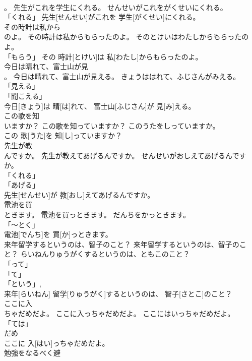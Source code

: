 \documentclass[8pt]{extreport}
\begin{document}
\begin{CJK}{UTF8}{min}
\\	。	先生がこれを学生にくれる。	せんせいがこれをがくせいにくれる。	
\\	「くれる」	先生[せんせい]がこれを 学生[がくせい]にくれる。		
\\	その時計は私から
\\	のよ。	その時計は私からもらったのよ。	そのとけいはわたしからもらったのよ。	
\\	「もらう」	その 時計[とけい]は 私[わたし]からもらったのよ。		
\\	今日は晴れて、富士山が見
\\	。	今日は晴れて、富士山が見える。	きょうははれて、ふじさんがみえる。	
\\	「見える」 
\\	「聞こえる」 
\\	今日[きょう]は 晴[は]れて、 富士山[ふじさん]が 見[み]える。		
\\	この歌を知
\\	いますか？	この歌を知っていますか？	このうたをしっていますか。	
\\	この 歌[うた]を 知[し]っていますか？		
\\	先生が教
\\	んですか。	先生が教えてあげるんですか。	せんせいがおしえてあげるんですか。	
\\	「くれる」 
\\	「あげる」 
\\	先生[せんせい]が 教[おし]えてあげるんですか。		
\\	電池を買
\\	ときます。	電池を買っときます。	だんちをかっときます。	
\\	「～とく」 
\\	電池[でんち]を 買[か]っときます。		
\\	来年留学するというのは、智子のこと？	来年留学するというのは、智子のこと？	らいねんりゅうがくするというのは、ともこのこと？	
\\	「って」 
\\	「て」 
\\	「という」, 
\\	来年[らいねん] 留学[りゅうがく]するというのは、 智子[さとこ]のこと？		
\\	ここに入
\\	ちゃだめだよ。	ここに入っちゃだめだよ。	ここにはいっちゃだめだよ。	
\\	「ては」
\\	だめ
\\	ここに 入[はい]っちゃだめだよ。		
\\	勉強をなるべく避

\end{CJK}
\end{document}
